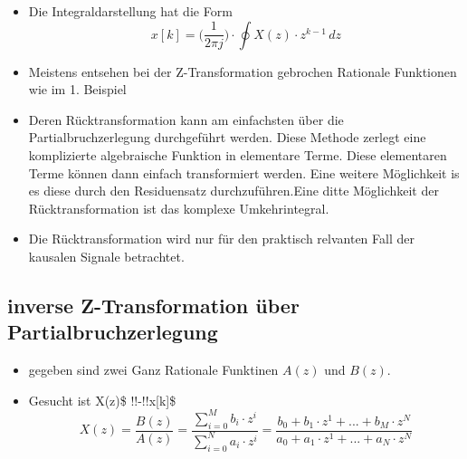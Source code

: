 \documentclass[11pt]{article}
\providecommand{\tightlist}{%
      \setlength{\itemsep}{0pt}\setlength{\parskip}{0pt}}
\begin{document}
    \begin{itemize}
\tightlist
\item
  Die Integraldarstellung hat die Form
  \[x[k] = \big( \frac{1}{2\pi j} \big) \cdot \oint X(z) \cdot z^{k-1}\,dz\]
\end{itemize}

    \begin{itemize}
\item
  Meistens entsehen bei der Z-Transformation gebrochen Rationale
  Funktionen wie im 1. Beispiel
\item
  Deren Rücktransformation kann am einfachsten über die
  Partialbruchzerlegung durchgeführt werden. Diese Methode zerlegt eine
  komplizierte algebraische Funktion in elementare Terme. Diese
  elementaren Terme können dann einfach transformiert werden. Eine
  weitere Möglichkeit is es diese durch den Residuensatz
  durchzuführen.Eine ditte Möglichkeit der Rücktransformation ist das
  komplexe Umkehrintegral.
\item
  Die Rücktransformation wird nur für den praktisch relvanten Fall der
  kausalen Signale betrachtet.
\end{itemize}

    \subsection{inverse Z-Transformation über
Partialbruchzerlegung}\label{inverse-z-transformation-uxfcber-partialbruchzerlegung}

\begin{itemize}
\tightlist
\item
  gegeben sind zwei Ganz Rationale Funktinen \(A(z)\) und \(B(z)\).
\end{itemize}

    \begin{itemize}
\tightlist
\item
  Gesucht ist X(z)\$ \bullet !!-!!\circ x{[}k{]}\$
  \[X(z) = \frac{B(z)}{A(z)} = \frac {\sum_{i=0}^M b_i \cdot z^{i}} {\sum_{i=0}^N a_i \cdot z^{i}} = \frac{b_0 + b_1 \cdot z^1 + ... + b_M \cdot z^N}{a_0 + a_1 \cdot z^1 + ... + a_N \cdot z^N}\]
\end{itemize}
\end{document}
